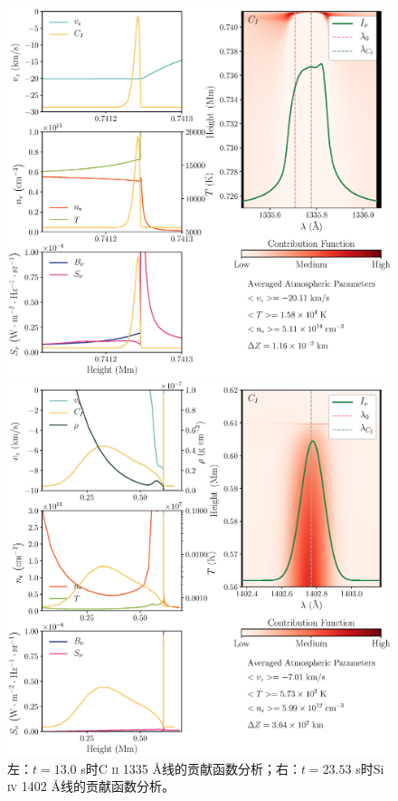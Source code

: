 \begin{figure}[htbp]
	\begin{minipage}[t]{0.5\linewidth}
	\centering
	\includegraphics[width=\linewidth]{figs/ctb_5F11_112_CII}
	\end{minipage}%
	\hfill
	\begin{minipage}[t]{0.5\linewidth}
	\centering
	\includegraphics[width=\linewidth]{figs/ctb_5F11_SiIV_210}
	\end{minipage}
	\caption{左：$t=13.0$ s时C \textsc{ii} 1335 \mbox{\AA}线的贡献函数分析；右：$t=23.53$ s时Si \textsc{iv} 1402 \mbox{\AA}线的贡献函数分析。}
	\label{fig:3.13}
\end{figure}


